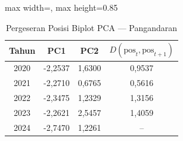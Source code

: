 \begin{table}[H]
\centering
\caption{Pergeseran Posisi Biplot PCA --- Pangandaran} \label{tab:appjarak_pca_skor_pangandaran}
\begin{adjustbox}{max width=\textwidth, max height=0.85\textheight}
\begin{tabular}{|c|c|c|c|}
\hline
\textbf{Tahun} & \textbf{PC1} & \textbf{PC2} & \textbf{$D(\text{pos}_t, \text{pos}_{t+1})$} \\
\hline
2020 & -2,2537 & 1,6300 & 0,9537 \\
2021 & -2,2710 & 0,6765 & 0,5616 \\
2022 & -2,3475 & 1,2329 & 1,3156 \\
2023 & -2,2621 & 2,5457 & 1,4059 \\
2024 & -2,7470 & 1,2261 & -- \\
\hline
\end{tabular}
\end{adjustbox}
\end{table}
